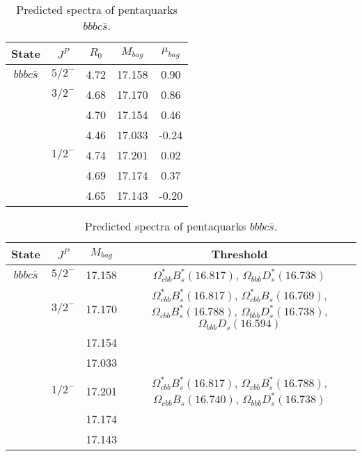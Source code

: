 \documentclass[prd,twocolumn,floatfix,nofootinbib]{revtex4}
\begin{document}
\renewcommand{\tabcolsep}{0.5cm}
\renewcommand{\arraystretch}{1.2}
\begin{table*}[!htbp]
    \caption{Predicted spectra of pentaquarks $bbbc\bar{s}$.}
    \begin{tabular}{ccccc}
        \hline\hline
        {\rm State} &$J^{P}$ &$R_{0}$ &$M_{bag}$ &$\mu_{bag}$ \\ \hline
        ${bbbc\bar{s}}$
            &${5/2}^{-}$    &4.72   &17.158 &0.90 \\
            &${3/2}^{-}$    &4.68   &17.170 &0.86 \\
            &               &4.70   &17.154 &0.46 \\
            &               &4.46   &17.033 &-0.24 \\
            &${1/2}^{-}$    &4.74   &17.201 &0.02 \\
            &               &4.69   &17.174 &0.37 \\
            &               &4.65   &17.143 &-0.20 \\
        \hline\hline
    \end{tabular}
\end{table*}

\renewcommand{\tabcolsep}{0.5cm}
\renewcommand{\arraystretch}{1.2}
\begin{table*}[!htbp]
    \caption{Predicted spectra of pentaquarks $bbbc\bar{s}$.}
    \begin{tabular}{cccc}
        \hline\hline
        {\rm State} &$J^{P}$ &$M_{bag}$ &Threshold \\ \hline
        ${bbbc\bar{s}}$
            &${5/2}^{-}$    &17.158 &$\Omega^{\ast}_{cbb} B^{\ast}_{s}(16.817)$, $\Omega_{bbb} D^{\ast}_{s}(16.738)$ \\
            &${3/2}^{-}$    &17.170 &$\Omega^{\ast}_{cbb} B^{\ast}_{s}(16.817)$, $\Omega^{\ast}_{cbb} B_{s}(16.769)$, $\Omega_{cbb} B^{\ast}_{s}(16.788)$, $\Omega_{bbb} D^{\ast}_{s}(16.738)$, $\Omega_{bbb} D_{s}(16.594)$ \\
            &               &17.154 & \\
            &               &17.033 & \\
            &${1/2}^{-}$    &17.201 &$\Omega^{\ast}_{cbb} B^{\ast}_{s}(16.817)$, $\Omega_{cbb} B^{\ast}_{s}(16.788)$, $\Omega_{cbb} B_{s}(16.740)$, $\Omega_{bbb} D^{\ast}_{s}(16.738)$ \\
            &               &17.174 & \\
            &               &17.143 & \\
        \hline\hline
    \end{tabular}
\end{table*}
\end{document}
